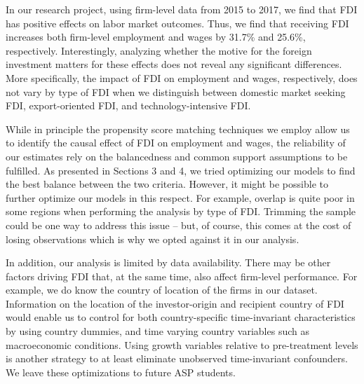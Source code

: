 In our research project, using firm-level data from 2015 to 2017, we find that FDI has positive effects on labor market outcomes. Thus, we find that receiving FDI increases both firm-level employment and wages by 31.7\% and 25.6\%, respectively. Interestingly, analyzing whether the motive for the foreign investment matters for these effects does not reveal any significant differences. More specifically, the impact of FDI on employment and wages, respectively, does not vary by type of FDI when we distinguish between domestic market seeking FDI, export-oriented FDI, and technology-intensive FDI.  \\ \par

While in principle the propensity score matching techniques we employ allow us to identify the causal effect of FDI on employment and wages, the reliability of our estimates rely on the balancedness and common support assumptions to be fulfilled. As presented in Sections 3 and 4, we tried optimizing our models to find the best balance between the two criteria. However, it might be possible to further optimize our models in this respect. For example, overlap is quite poor in some regions when performing the analysis by type of FDI. Trimming the sample could be one way to address this issue – but, of course, this comes at the cost of losing observations which is why we opted against it in our analysis.  \\ \par 

In addition, our analysis is limited by data availability. There may be other factors driving FDI that, at the same time, also affect firm-level performance. For example, we do know the country of location of the firms in our dataset. Information on the location of the investor-origin and recipient country of FDI would enable us to control for both country-specific time-invariant characteristics by using country dummies, and time varying country variables such as macroeconomic conditions. Using growth variables relative to pre-treatment levels is another strategy to at least eliminate unobserved time-invariant confounders. We leave these optimizations to future ASP students.  